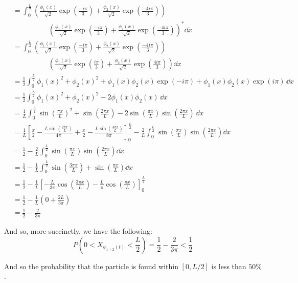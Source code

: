 \documentclass{article}
\renewcommand{\eval}[3]{\left[#1\right]_{#2}^{#3}}
\begin{document}
\begin{align*}
    &=\int_0^{\frac{L}{2}}\left(\frac{\phi_1(x)}{\sqrt{2}}\exp\left(\frac{-i\pi}{3}\right)+\frac{\phi_2(x)}{\sqrt{2}}\exp\left(\frac{-4i\pi}{3}\right)\right)\\
    &\qquad\qquad\quad\left(\frac{\phi_1(x)}{\sqrt{2}}\exp\left(\frac{-i\pi}{3}\right)+\frac{\phi_2(x)}{\sqrt{2}}\exp\left(\frac{-4i\pi}{3}\right)\right)^*\dd{x}\tag{$\|z\|^2=z^*z$}\\
    &=\int_0^{\frac{L}{2}}\left(\frac{\phi_1(x)}{\sqrt{2}}\exp\left(\frac{-i\pi}{3}\right)+\frac{\phi_2(x)}{\sqrt{2}}\exp\left(\frac{-4i\pi}{3}\right)\right)\\
    &\qquad\qquad\quad\left(\frac{\phi_1(x)}{\sqrt{2}}\exp\left(\frac{i\pi}{3}\right)+\frac{\phi_2(x)}{\sqrt{2}}\exp\left(\frac{4i\pi}{3}\right)\right)\dd{x}\tag{conjugate is distributive}\\
    &=\frac{1}{2}\int_0^{\frac{L}{2}}\phi_1(x)^2+\phi_2(x)^2+\phi_1(x)\phi_2(x)\exp(-i\pi)+\phi_1(x)\phi_2(x)\exp(i\pi)\,\dd x\\
    &=\frac{1}{2}\int_0^{\frac{L}{2}}\phi_1(x)^2+\phi_2(x)^2-2\phi_1(x)\phi_2(x)\,\dd x\tag{Euler's identity}\\
    &=\frac{1}{L}\int_0^{\frac{L}{2}}\sin\left(\frac{\pi x}{L}\right)^2+\sin\left(\frac{2\pi x}{L}\right)-2\sin\left(\frac{\pi x}{L}\right)\sin\left(\frac{2\pi x}{L}\right)\,\dd x\\
    &=\frac{1}{L}\eval{\frac{x}{2}-\frac{L\sin\left(\frac{2\pi x}{L}\right)}{4\pi}+\frac{x}{2}-\frac{L\sin\left(\frac{4\pi x}{L}\right)}{8\pi}}{0}{\frac{L}{2}}-\frac{2}{L}\int_0^{\frac{L}{2}}\sin\left(\frac{\pi x}{L}\right)\sin\left(\frac{2\pi x}{L}\right)\dd x\\
    &=\frac{1}{2}-\frac{2}{L}\int_0^{\frac{L}{2}}\sin\left(\frac{\pi x}{L}\right)\sin\left(\frac{2\pi x}{L}\right)\dd x\\
    &=\frac{1}{2}-\frac{1}{L}\int_0^{\frac{L}{2}}\sin\left(\frac{3\pi x}{L}\right)+\sin\left(\frac{\pi x}{L}\right)\dd x\tag{product-to-sum formula}\\
    &=\frac{1}{2}-\frac{1}{L}\eval{-\frac{L}{3\pi}\cos\left(\frac{3\pi x}{L}\right)-\frac{L}{\pi}\cos\left(\frac{\pi x}{L}\right)}{0}{\frac{L}{2}}\\
    &=\frac{1}{2}-\frac{1}{L}\left(0+\frac{2L}{3\pi}\right)\\
    &=\frac{1}{2}-\frac{2}{3\pi}
\end{align*}

And so, more succinctly, we have the following:
$$P\left(0<X_{\psi_{1+2}(t)}<\frac{L}{2}\right)=\frac{1}{2}-\frac{2}{3\pi}<\frac{1}{2}$$

And so the probability that the particle is found within $[0,L/2]$ is less than $50\%$.
\end{document}
